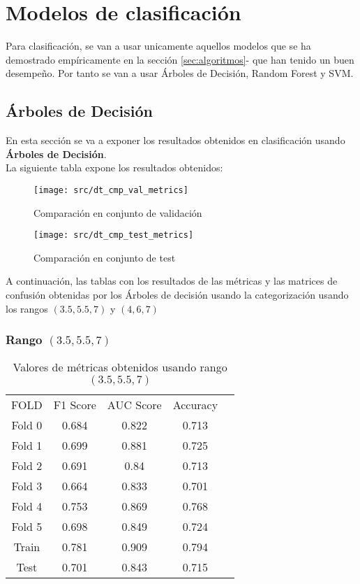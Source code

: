 \section{Modelos de clasificación}
Para clasificación, se van a usar unicamente aquellos modelos que se ha demostrado empíricamente en la sección \ref{sec:algoritmos}- que han tenido un buen desempeño. Por tanto se van a usar Árboles de Decisión, Random Forest y SVM.
\subsection{Árboles de Decisión}
En esta sección se va a exponer los resultados obtenidos en clasificación usando \textbf{Árboles de Decisión}.\\
La siguiente tabla expone los resultados obtenidos:
\begin{figure}[H]
	\centering
	\texttt{[image: src/dt\_cmp\_val\_metrics]}
	\caption{Comparación en conjunto de validación}
	\label{fig:dtre_class_val}
\end{figure}
\begin{figure}[H]
	\centering
	\texttt{[image: src/dt\_cmp\_test\_metrics]}
	\caption{Comparación en conjunto de test}
	\label{fig:dtre_class_testl}
\end{figure}
A continuación, las tablas con los resultados de las métricas y las matrices de confusión obtenidas por los Árboles de decisión usando la categorización usando los rangos $(3.5,5.5,7)$ y $(4,6,7)$
\subsubsection*{Rango $(3.5,5.5,7)$}
\begin{table}[H]
	\centering
	\begin{tabular}{|c|c|c|c|c}
		\cline{1-4}
		FOLD   & F1 Score & AUC Score & Accuracy \\ \cline{1-4}
		Fold 0 & 0.684    & 0.822     & 0.713    \\ \cline{1-4}
		Fold 1 & 0.699    & 0.881     & 0.725    \\ \cline{1-4}
		Fold 2 & 0.691    & 0.84      & 0.713    \\ \cline{1-4}
		Fold 3 & 0.664    & 0.833     & 0.701    \\ \cline{1-4}
		Fold 4 & 0.753    & 0.869     & 0.768    \\ \cline{1-4}
		Fold 5 & 0.698    & 0.849     & 0.724    \\ \cline{1-4}
		Train  & 0.781    & 0.909     & 0.794    \\ \cline{1-4}
		Test   & 0.701    & 0.843     & 0.715    \\ \cline{1-4}
	\end{tabular}
	\caption{Valores de métricas obtenidos usando rango $(3.5,5.5,7)$}
\end{table}

